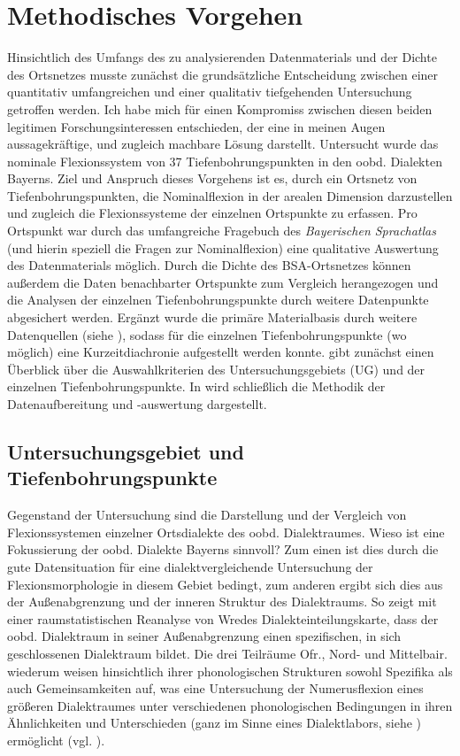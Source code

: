 \chapter{Methodisches Vorgehen}\label{chap:6}\largerpage[2]
Hinsichtlich des Umfangs des zu analysierenden Datenmaterials und der Dichte des Ortsnetzes musste zunächst die grundsätzliche Entscheidung zwischen einer quantitativ umfangreichen und einer qualitativ tiefgehenden Untersuchung getroffen werden. Ich habe mich für einen Kompromiss zwischen diesen beiden legitimen Forschungsinteressen entschieden, der eine in meinen Augen aussagekräftige, und zugleich machbare Lösung darstellt. Untersucht wurde das nominale Flexionssystem von 37 Tiefenbohrungspunkten in den oobd. Dialekten Bayerns. Ziel und Anspruch dieses Vorgehens ist es, durch ein Ortsnetz von Tiefenbohrungspunkten, die Nominalflexion in der arealen Dimension darzustellen und zugleich die Flexionssysteme der einzelnen Ortspunkte zu erfassen. Pro Ortspunkt war durch das umfangreiche Fragebuch des \textit{Bayerischen Sprachatlas} (und hierin speziell die Fragen zur Nominalflexion) eine qualitative Auswertung des Datenmaterials möglich. Durch die Dichte des BSA-Ortsnetzes können außerdem die Daten benachbarter Ortspunkte zum Vergleich herangezogen und die Analysen der einzelnen Tiefenbohrungspunkte durch weitere Datenpunkte abgesichert werden. Ergänzt wurde die primäre Materialbasis durch weitere Datenquellen (siehe ), sodass für die einzelnen Tiefenbohrungspunkte (wo möglich) eine Kurzeitdiachronie aufgestellt werden konnte.  gibt zunächst einen Überblick über die Auswahlkriterien des Untersuchungsgebiets (UG) und der einzelnen Tiefenbohrungspunkte. In  wird schließlich die Methodik der Datenaufbereitung und -auswertung dargestellt.

\section{Untersuchungsgebiet und Tiefenbohrungspunkte}
\label{sec:6.1}
Gegenstand der Untersuchung sind die Darstellung und der Vergleich von Flexionssystemen einzelner Ortsdialekte des oobd. Dialektraumes. Wieso ist eine Fokussierung der oobd. Dialekte Bayerns sinnvoll? Zum einen ist dies durch die gute Datensituation für eine dialektvergleichende Untersuchung der Flexionsmorphologie in diesem Gebiet bedingt, zum anderen ergibt sich dies aus der Außenabgrenzung und der inneren Struktur des Dialektraums. So zeigt \citet{Lameli2013} mit einer raumstatistischen Reanalyse von Wredes Dialekteinteilungskarte, dass der oobd. Dialektraum in seiner Außenabgrenzung einen spezifischen, in sich geschlossenen Dialektraum bildet. Die drei Teilräume Ofr., Nord- und Mittelbair. wiederum weisen hinsichtlich ihrer phonologischen Strukturen sowohl Spezifika als auch Gemeinsamkeiten auf, was eine Untersuchung der Numerusflexion eines größeren Dialektraumes unter verschiedenen phonologischen Bedingungen in ihren Ähnlichkeiten und Unterschieden (ganz im Sinne eines Dialektlabors, siehe ) ermöglicht (vgl. \citealt[3]{Rowley1997}).


